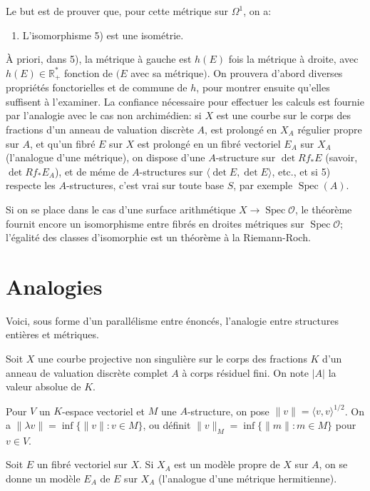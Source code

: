 \documentclass[11pt,a4paper]{article}
\theoremstyle{plain}
\theoremstyle{definition}
\DeclareMathOperator{\Spec}{Spec}
\newcommand{\R}{\mathbb{R}}
\newcommand{\cO}{\mathcal{O}}
\begin{document}
Le but est de prouver que, pour cette m\'etrique sur $\Omega^1$, on a:
\begin{enumerate}
\item[8)] L'isomorphisme 5) est une isom\'etrie.
\end{enumerate}

\`A priori, dans 5), la m\'etrique \`a gauche est $h(E)$ fois la m\'etrique \`a droite, avec $h(E) \in \R_+^*$ fonction de $(E$ avec sa m\'etrique$)$. On prouvera d'abord diverses propri\'et\'es fonctorielles et de commune de $h$, pour montrer ensuite qu'elles suffisent \`a l'examiner. La confiance n\'ecessaire pour effectuer les calculs est fournie par l'analogie avec le cas non archim\'edien: si $X$ est une courbe sur le corps des fractions d'un anneau de valuation discr\`ete $A$, est prolong\'e en $X_A$ r\'egulier propre sur $A$, et qu'un fibr\'e $E$ sur $X$ est prolong\'e en un fibr\'e vectoriel $E_A$ sur $X_A$ (l'analogue d'une m\'etrique), on dispose d'une $A$-structure sur $\det Rf_* E$ (savoir, $\det Rf_* E_A$), et de m\'eme de $A$-structures sur $\langle \det E, \det E \rangle$, etc., et si 5) respecte les $A$-structures, c'est vrai sur toute base $S$, par exemple $\Spec(A)$.

Si on se place dans le cas d'une surface arithm\'etique $X \to \Spec \cO$, le th\'eor\`eme fournit encore un isomorphisme entre fibr\'es en droites m\'etriques sur $\Spec \cO$; l'\'egalit\'e des classes d'isomorphie est un th\'eor\`eme \`a la Riemann-Roch.

\section{Analogies}

Voici, sous forme d'un parall\'elisme entre \'enonc\'es, l'analogie entre structures enti\`eres et m\'etriques.

Soit $X$ une courbe projective non singuli\`ere sur le corps des fractions $K$ d'un anneau de valuation discr\`ete complet $A$ \`a corps r\'esiduel fini. On note $|A|$ la valeur absolue de $K$.

Pour $V$ un $K$-espace vectoriel et $M$ une $A$-structure, on pose $\|v\| = \langle v, v \rangle^{1/2}$. On a $\|\lambda v\| = \inf\{\|v\| : v \in M\}$, ou d\'efinit $\|v\|_M = \inf\{\|m\| : m \in M\}$ pour $v \in V$.

Soit $E$ un fibr\'e vectoriel sur $X$. Si $X_A$ est un mod\`ele propre de $X$ sur $A$, on se donne un mod\`ele $E_A$ de $E$ sur $X_A$ (l'analogue d'une m\'etrique hermitienne).
\end{document}
